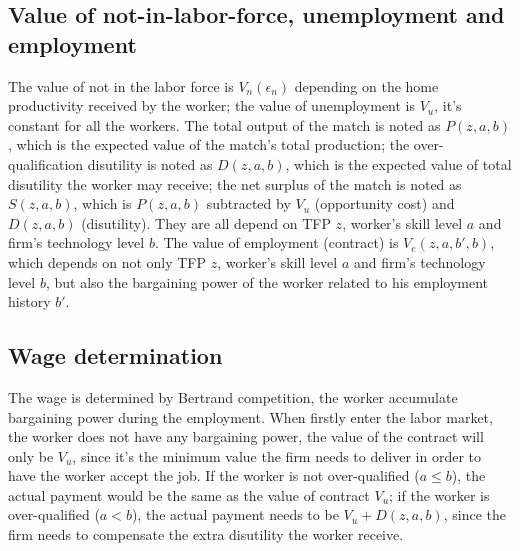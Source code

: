 \documentclass{article}
\newcommand{\1}{\mathbb{1}}
\begin{document}
\subsection{Value of not-in-labor-force, unemployment and employment }
The value of not in the labor force is $V_n(\epsilon_n)$ depending on the home productivity received by the worker; the value of unemployment is $V_u$, it's constant for all the workers. The total output of the match is noted as $P(z,a,b)$, which is the expected value of the match's total production; the over-qualification disutility is noted as $D(z,a,b)$, which is the expected value of total disutility the worker may receive; the net surplus of the match is noted as $S(z,a,b)$, which is $P(z,a,b)$ subtracted by $V_u$ (opportunity cost) and $D(z,a,b)$ (disutility). They are all depend on TFP $z$, worker's skill level $a$ and firm's technology level $b$. The value of employment (contract) is $V_e(z,a,b',b)$, which depends on not only TFP $z$, worker's skill level $a$ and firm's technology level $b$, but also the bargaining power of the worker related to his employment history $b'$. 

\subsection{Wage determination}
The wage is determined by Bertrand competition, the worker accumulate bargaining power during the employment. When firstly enter the labor market, the worker does not have any bargaining power, the value of the contract will only be $V_u$, since it's the minimum value the firm needs to deliver in order to have the worker accept the job. If the worker is not over-qualified ($a \leq b$), the actual payment would be the same as the value of contract $V_u$; if the worker is over-qualified ($a<b$), the actual payment needs to be $V_u+D(z,a,b)$, since the firm needs to compensate the extra disutility the worker receive.  \\
\end{document}
